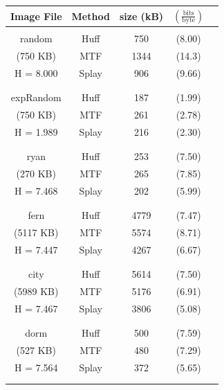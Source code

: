 \documentclass[twoside]{article}
\begin{document}
\begin{multicols}{2}
\begin{center}
\begin{tabular}{ c c c c c }
Image File   & Method & size (kB) & $(\frac{\text{bits}}{\text{byte}})$ \\ \hline \vspace{-0.75em}  \\ 
random      & Huff  & 750  & (8.00) \\
(750 KB)    & MTF   & 1344 & (14.3) \\
H = 8.000   & Splay & 906  & (9.66) \\
\vspace{-0.75em} \\ \hline \vspace{-0.75em} \\
expRandom   & Huff  & 187 & (1.99) \\
(750 KB)    & MTF   & 261 & (2.78) \\
H = 1.989   & Splay & 216 & (2.30) \\
\vspace{-0.75em} \\ \hline \vspace{-0.75em} \\
ryan        & Huff  & 253 & (7.50) \\
(270 KB)    & MTF   & 265 & (7.85) \\
H = 7.468   & Splay & 202 & (5.99) \\
\vspace{-0.75em} \\ \hline \vspace{-0.75em} \\
fern        & Huff  & 4779 & (7.47) \\
(5117 KB)   & MTF   & 5574 & (8.71) \\
H = 7.447   & Splay & 4267 & (6.67) \\
\vspace{-0.75em} \\ \hline \vspace{-0.75em} \\
city        & Huff  & 5614 & (7.50) \\
(5989 KB)   & MTF   & 5176 & (6.91) \\
H = 7.467   & Splay & 3806 & (5.08) \\
\vspace{-0.75em} \\ \hline \vspace{-0.75em} \\
dorm        & Huff  & 500 & (7.59) \\
(527 KB)    & MTF   & 480 & (7.29) \\
H = 7.564   & Splay & 372 & (5.65) \\
\vspace{-0.75em} \\ \hline \\
\end{tabular}
\end{center}


\end{multicols}
\end{document}
